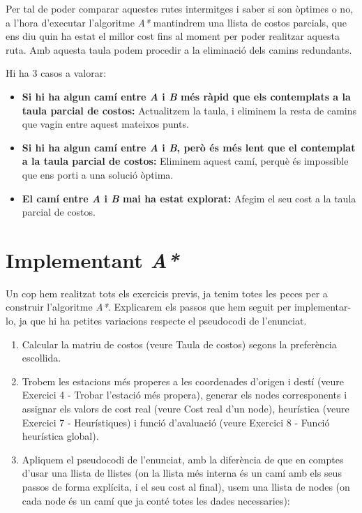 \documentclass[a4paper,12pt]{article}
\begin{document}
            
            Per tal de poder comparar aquestes rutes intermitges i saber si son òptimes o no, a l’hora d’executar l’algoritme \textit{A*} mantindrem una llista de costos parcials, que ens diu quin ha estat el millor cost fins al moment per poder realitzar aquesta ruta. Amb aquesta taula podem procedir a la eliminació dels camins redundants.
            
            Hi ha 3 casos a valorar:
            \begin{itemize}
                \item \textbf{Si hi ha algun camí entre \textit{A} i \textit{B} més ràpid que els contemplats a la taula parcial de costos:} Actualitzem la taula, i eliminem la resta de camins que vagin entre aquest mateixos punts.
                \item \textbf{Si hi ha algun camí entre \textit{A} i \textit{B}, però és més lent que el contemplat a la taula parcial de costos:} Eliminem aquest camí, perquè és impossible que ens porti a una solució òptima.
                \item \textbf{El camí entre \textit{A} i \textit{B} mai ha estat explorat:} Afegim el seu cost a la taula parcial de costos.
            \end{itemize}

    \pagebreak
        
    \section{Implementant \textit{A*}}
    
        Un cop hem realitzat tots els exercicis previs, ja tenim totes les peces per a construir l’algoritme \textit{A*}. Explicarem els passos que hem seguit per implementar-lo, ja que hi ha petites variacions respecte el pseudocodi de l’enunciat.
        
        \begin{enumerate}
            \item Calcular la matriu de costos (veure Taula de costos) segons la preferència escollida.
            \item Trobem les estacions més properes a les coordenades d'origen i destí (veure Exercici 4 - Trobar l’estació més propera), generar els nodes corresponents i assignar els valors de cost real (veure Cost real d’un node), heurística (veure Exercici 7 - Heurístiques) i funció d’avaluació (veure Exercici 8 - Funció heurística global).
            \item Apliquem el pseudocodi de l'enunciat, amb la diferència de que en comptes d’usar una llista de llistes (on la llista més interna és un camí amb els seus passos de forma explícita, i el seu cost al final), usem una llista de nodes (on cada node és un camí que ja conté totes les dades necessaries):
        \end{enumerate}
    
\end{document}
